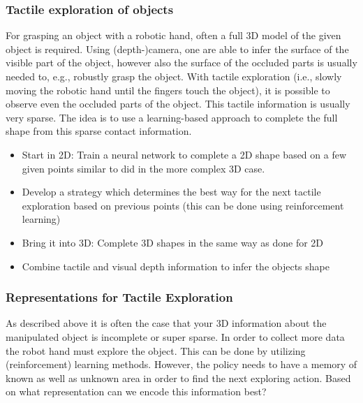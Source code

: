 \documentclass[a4paper]{article}
\begin{document}
\subsubsection{Tactile exploration of objects}

For grasping an object with a robotic hand, often a full 3D model of the given object is required.
Using (depth-)camera, one are able to infer the surface of the visible part of the object, however also the surface of the occluded parts is usually needed to, e.g., robustly grasp the object.
With tactile exploration (i.e., slowly moving the robotic hand until the fingers touch the object), it is possible to observe even the occluded parts of the object.
This tactile information is usually very sparse. The idea is to use a learning-based approach to complete the full shape from this sparse contact information.

\begin{itemize}
  \item Start in 2D: Train a neural network to complete a 2D shape based on a few given points similar to \citet{watkins2019multi} did in the more complex 3D case.
  \item Develop a strategy which determines the best way for the next tactile exploration based on previous points (this can be done using reinforcement learning)
  \item Bring it into 3D: Complete 3D shapes in the same way as done for 2D
  \item Combine tactile and visual depth information to infer the objects shape
\end{itemize}

\subsubsection{Representations for Tactile Exploration}

As described above it is often the case that your 3D information about the manipulated object is incomplete or super sparse.
In order to collect more data the robot hand must explore the object.
This can be done by utilizing (reinforcement) learning methods.
However, the policy needs to have a memory of known as well as unknown area in order to find the next exploring action.
Based on what representation can we encode this information best?  
\end{document}
